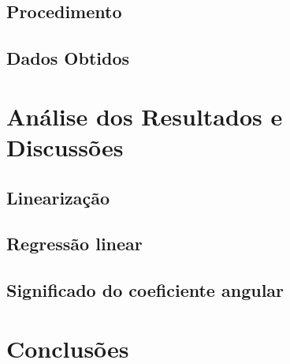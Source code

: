 \documentclass[12pt,a4paper]{article}
\begin{document}
\subsection{Procedimento}





\subsection{Dados Obtidos}


\section{Análise dos Resultados e Discussões}
\subsection{Linearização}


\subsection{Regressão linear}

\subsection{Significado do coeficiente angular}

\section{Conclusões}
\end{document}
